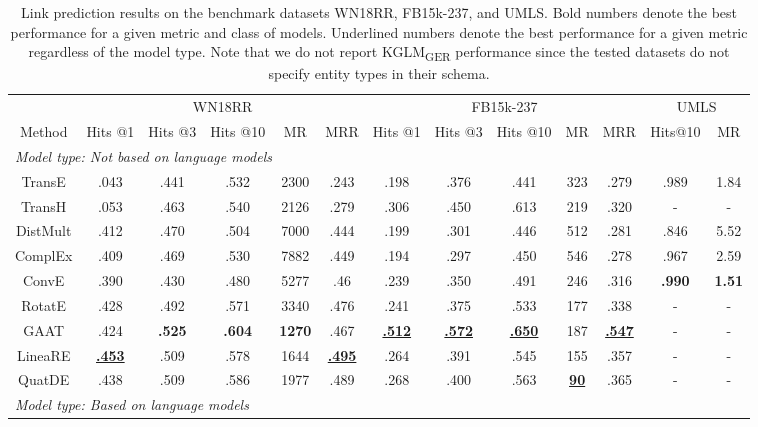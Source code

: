 \documentclass[11pt]{article}
\begin{document}
\begin{table*}[ht]
\caption{Link prediction results on the benchmark datasets WN18RR, FB15k-237, and UMLS. Bold numbers denote the best performance for a given metric and class of models. Underlined numbers denote the best performance for a given metric regardless of the model type. Note that we do not report KGLM\textsubscript{GER} performance since the tested datasets do not specify entity types in their schema.}
\small
\centering
\setlength{\tabcolsep}{3.5pt}
\begin{tabular}{ccccccccccccc}
    \toprule
    \multicolumn{1}{c}{} & \multicolumn{5}{c}{WN18RR} & \multicolumn{5}{c}{FB15k-237} & \multicolumn{2}{c}{UMLS} \\
    \cmidrule(r){2-6} \cmidrule(r){7-11} \cmidrule(r){12-13}
    Method & Hits @1 & Hits @3 & Hits @10 & MR & MRR & Hits @1 & Hits @3 & Hits @10 & MR & MRR & Hits@10 & MR\\
    \midrule
    \multicolumn{6}{l}{\emph{Model type: Not based on language models}} \\
    \midrule
    TransE & .043 & .441 & .532 & 2300 & .243 & .198 & .376 & .441 & 323 & .279 & .989 & 1.84 \\
    TransH & .053 & .463 & .540 & 2126 & .279 & .306 & .450 & .613 & 219 & .320 & - & - \\
    DistMult & .412 & .470 & .504 & 7000 & .444 & .199 & .301 & .446 & 512 & .281 & .846 & 5.52 \\
    ComplEx & .409 & .469 & .530 & 7882 & .449 & .194 & .297 & .450 & 546 & .278 & .967 & 2.59\\
    ConvE & .390 & .430 & .480 & 5277 & .46 & .239 & .350 & .491 & 246 & .316 & \textbf{.990} & \textbf{1.51}\\
    RotatE & .428 & .492 & .571 & 3340 & .476 & .241 & .375 & .533 & 177 & .338 & - & -\\
    GAAT & .424 & \textbf{.525} & \textbf{.604} & \textbf{1270} & .467 & \underline{\textbf{.512}} & \underline{\textbf{.572}} & \underline{\textbf{.650}} & 187 & \underline{\textbf{.547}} & - & - \\
    LineaRE & \underline{\textbf{.453}} & .509 & .578 & 1644 & \underline{\textbf{.495}} & .264 & .391 & .545 & 155 & .357 & - & - \\
    QuatDE & .438 & .509 & .586 & 1977 & .489 & .268 & .400 & .563 & \underline{\textbf{90}} & .365 & - & - \\
    \midrule
    \multicolumn{6}{l}{\emph{Model type: Based on language models}} \\

\end{tabular}
\end{table*}
\end{document}
